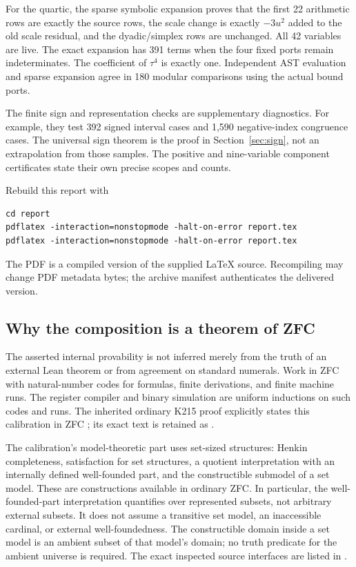 \documentclass[11pt,a4paper]{article}
\theoremstyle{remark}\newtheorem{remark}[theorem]{Remark}
\begin{document}
For the quartic, the sparse symbolic expansion proves that the first 22
arithmetic rows are exactly the source rows, the scale change is exactly
$-3u^2$ added to the old scale residual, and the dyadic/simplex rows are
unchanged. All 42 variables are live. The exact expansion has 391 terms
when the four fixed ports remain indeterminates. The coefficient of
$\tau^4$ is exactly one. Independent AST evaluation and sparse expansion
agree in 180 modular comparisons using the actual bound ports.

The finite sign and representation checks are supplementary diagnostics.
For example, they test 392 signed interval cases and 1,590 negative-index
congruence cases. The universal sign theorem is the proof in
Section~\ref{sec:sign}, not an extrapolation from those samples.
The positive and nine-variable component certificates state their own
precise scopes and counts.

Rebuild this report with
\begin{verbatim}
cd report
pdflatex -interaction=nonstopmode -halt-on-error report.tex
pdflatex -interaction=nonstopmode -halt-on-error report.tex
\end{verbatim}
The PDF is a compiled version of the supplied LaTeX source. Recompiling
may change PDF metadata bytes; the archive manifest authenticates the
delivered version.

\subsection{Why the composition is a theorem of ZFC}

The asserted internal provability is not inferred merely from the truth
of an external Lean theorem or from agreement on standard numerals.
Work in ZFC with natural-number codes for formulas, finite derivations,
and finite machine runs. The register compiler and binary simulation
are uniform inductions on such codes and runs. The inherited ordinary
K215 proof explicitly states this calibration in ZFC
\cite{k215}; its exact text is retained as
.

The calibration's model-theoretic part uses set-sized structures:
Henkin completeness, satisfaction for set structures, a quotient
interpretation with an internally defined well-founded part, and the
constructible submodel of a set model. These are constructions available
in ordinary ZFC. In particular, the well-founded-part interpretation
quantifies over represented subsets, not arbitrary external subsets.
It does not assume a transitive set model, an inaccessible cardinal, or
external well-foundedness. The constructible domain inside a set model
is an ambient subset of that model's domain; no truth predicate for the
ambient universe is required. The exact inspected source interfaces are
listed in .
\end{document}

